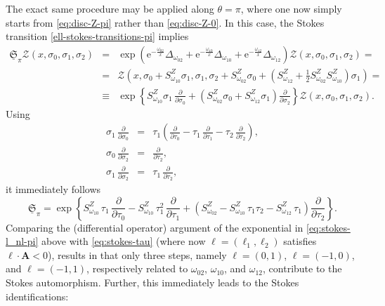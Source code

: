 \documentclass[11pt,a4paper]{article}
\newcommand{\be}{\begin{equation}}
\newcommand{\ee}{\end{equation}}
\begin{document}
The exact same procedure may be applied along $\theta=\pi$, where one now simply starts from \eqref{eq:disc-Z-pi} rather than \eqref{eq:disc-Z-0}. In this case, the Stokes transition \eqref{ell-stokes-transitions-pi} implies
%
\begin{eqnarray}
\underline{\mathfrak{S}}_\pi \mathcal{Z} (x, \sigma_0, \sigma_1, \sigma_2) &=& \exp \left( \mathrm{e}^{-\frac{\omega_{02}}{x}} \Delta_{\omega_{02}} + \mathrm{e}^{-\frac{\omega_{10}}{x}} \Delta_{\omega_{10}} + \mathrm{e}^{-\frac{\omega_{12}}{x}} \Delta_{\omega_{12}} \right) \mathcal{Z} (x, \sigma_0, \sigma_1, \sigma_2) = \nonumber \\
&=& \mathcal{Z} \left( x, \sigma_0 + S_{\omega_{10}}^{Z} \sigma_1, \sigma_1, \sigma_2 + S_{\omega_{02}}^{Z} \sigma_0 + \left( S_{\omega_{12}}^{Z} + \frac{1}{2} S_{\omega_{02}}^{Z} S_{\omega_{10}}^{Z} \right) \sigma_1 \right) = \nonumber \\
&\equiv& \exp \left\{ S_{\omega_{10}}^{Z} \sigma_1\, \frac{\partial}{\partial\sigma_0} + \left( S_{\omega_{02}}^{Z} \sigma_0 + S_{\omega_{12}}^{Z} \sigma_1 \right) \frac{\partial}{\partial\sigma_2} \right\} \mathcal{Z} (x, \sigma_0, \sigma_1, \sigma_2).
\end{eqnarray}
%
\noindent
Using
%
\begin{eqnarray}
\sigma_1\, \frac{\partial}{\partial\sigma_0} &=& \tau_1 \left( \frac{\partial}{\partial\tau_0} - \tau_1\, \frac{\partial}{\partial\tau_1} - \tau_2\, \frac{\partial}{\partial\tau_2} \right), \\
\sigma_0\, \frac{\partial}{\partial\sigma_2} &=& \frac{\partial}{\partial\tau_2}, \\
\sigma_1\, \frac{\partial}{\partial\sigma_2} &=& \tau_1\, \frac{\partial}{\partial\tau_2},
\end{eqnarray}
%
\noindent
it immediately follows
%
\be
\label{eq:stokes-l_nl-pi}
\underline{\mathfrak{S}}_\pi = \exp \left\{ S_{\omega_{10}}^Z\, \tau_1\, \frac{\partial}{\partial\tau_0} - S_{\omega_{10}}^Z\, \tau_1^2\, \frac{\partial}{\partial\tau_1} + \left( S_{\omega_{02}}^Z - S_{\omega_{10}}^Z\, \tau_1 \tau_2 - S_{\omega_{12}}^Z\, \tau_1 \right) \frac{\partial}{\partial\tau_2} \right\}.
\ee
%
\noindent
Comparing the (differential operator) argument of the exponential in \eqref{eq:stokes-l_nl-pi} above with \eqref{eq:stokes-tau} (where now $\boldsymbol{\ell} = (\ell_1,\ell_2)$ satisfies $\boldsymbol{\ell} \cdot \boldsymbol{A} < 0$), results in that only three steps, namely $\boldsymbol{\ell} = (0,1)$, $\boldsymbol{\ell} = (-1,0)$, and $\boldsymbol{\ell} = (-1,1)$, respectively related to $\omega_{02}$, $\omega_{10}$, and $\omega_{12}$, contribute to the Stokes automorphism. Further, this immediately leads to the Stokes identifications:
\end{document}
